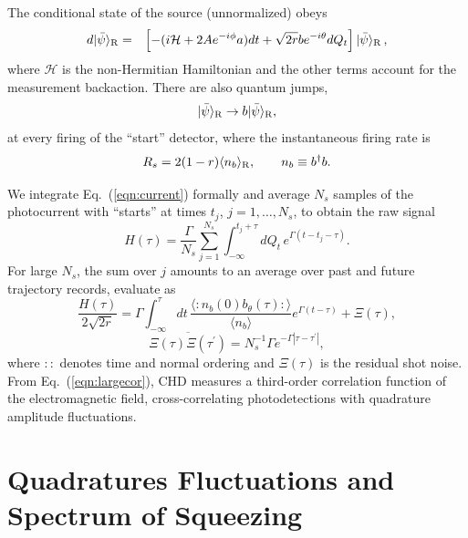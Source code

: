 \documentclass[twocolumn,aps,eqsecnum,showkeys,amsmath]{revtex4}
\newcommand{\mcH}{\mathcal{H}} 	%
\providecommand{\vxp}[1]{\langle #1 \rangle}
\providecommand{\ket}[1]{\lvert #1 \rangle}
\begin{document}
The conditional state of the source (unnormalized) obeys
%
\begin{eqnarray}
d \ket{\bar\psi}_{\rm R} &=& \left[-(i\mcH +2Ae^{-i\phi} a)dt 
	+\sqrt{2r} b e^{-i\theta}dQ_t \right] \ket{\bar\psi}_{\rm R} \,, 
	\nonumber \\ 	\label{eqn:schrodinger} 
\end{eqnarray}
where $\mcH$ is the non-Hermitian Hamiltonian and the other terms 
account for the measurement backaction. There are also quantum jumps,
%
\begin{equation}
\ket{\bar\psi}_{\rm R} \to b \ket{\bar\psi}_{\rm R},
\end{equation}
at every firing of the ``start'' detector, where the instantaneous
firing rate is
%
\begin{equation}
R_s = 2(1-r) \vxp{n_b}_{\rm R}, 	\qquad n_b\equiv b^\dagger b.
\end{equation}

We integrate Eq.\ (\ref{eqn:current}) formally and average $N_s$ 
samples of the photocurrent with ``starts'' at times $t_j$, 
$j=1,\ldots,N_s$, to obtain the raw signal
%
\begin{equation}
H(\tau) = \frac\Gamma{N_s}\sum_{j=1}^{N_s}\int_{-\infty}^{t_j+\tau}\!dQ_t\,
	e^{\Gamma(t-t_j-\tau)}.
\end{equation}
For large $N_s$, the sum over $j$ amounts to an average over past and
future trajectory records, evaluate as \cite{CCFO00}
%
\begin{equation}
\frac{H(\tau)}{2\sqrt{2r}} =
  \Gamma \int_{-\infty}^\tau dt\,\frac{ \vxp{ : n_b(0) b_\theta(\tau) :}}{\vxp{n_b}} 			e^{\Gamma(t-\tau)} +\Xi(\tau),
\label{eqn:largecor} 
\end{equation}
%
\begin{equation}
\overline{\Xi(\tau)\Xi(\tau^\prime)} 
	= N_s^{-1}\Gamma e^{-\Gamma |\tau-\tau^\prime|},
\end{equation}
where $::$ denotes time and normal ordering and $\Xi(\tau)$ is the
residual shot noise.
From Eq.\ (\ref{eqn:largecor}), CHD measures a third-order correlation
function of the electromagnetic field, cross-correlating 
photodetections with quadrature amplitude fluctuations.

\section{Quadratures Fluctuations and Spectrum of Squeezing}
\end{document}
